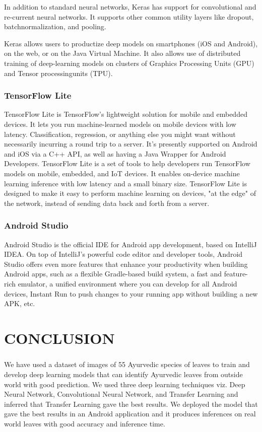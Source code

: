 In addition to standard neural networks, Keras has support for convolutional and re-current  neural  networks.   It  supports  other  common  utility  layers  like  dropout,  batchnormalization, and pooling.

Keras allows users to productize deep models on smartphones (iOS and Android), on the web, or on the Java Virtual Machine. It also allows use of distributed training of deep-learning models on clusters of Graphics Processing Units (GPU) and Tensor processingunits (TPU).

\subsection{TensorFlow Lite}
TensorFlow Lite is TensorFlow’s lightweight solution for mobile and embedded devices. It lets you run machine-learned models on mobile devices with low latency. Classification, regression, or anything else you might want without necessarily incurring a round trip to a server. It’s presently supported on Android and iOS via a C++ API, as well as having a Java Wrapper for Android Developers. TensorFlow Lite is a set of tools to help developers run TensorFlow models on mobile, embedded, and IoT devices. It enables on-device machine learning inference with low latency and a small binary size. TensorFlow Lite is designed to make it easy to perform machine learning on devices, "at the edge" of the network, instead of sending data back and forth from a server.

\subsection{Android Studio}
Android Studio is the official IDE for Android app development, based on IntelliJ IDEA. On top of IntelliJ’s powerful code editor and developer tools, Android Studio offers even more features that enhance your productivity when building Android apps, such as a flexible Gradle-based build system, a fast and feature-rich emulator, a unified environment where you can develop for all Android devices, Instant Run to push changes to your running app without building a new APK, etc.


\chapter{CONCLUSION}
\paragraph{}
We have used a dataset of images of 55 Ayurvedic species of leaves to train and develop deep learning models that can identify Ayurvedic leaves from outside world with good prediction. We used three deep learning techniques viz.  Deep Neural Network, Convolutional Neural Network, and Transfer Learning and inferred that Transfer Learning gave the best results. We deployed the model that gave the best results in an Android application and it produces inferences on real world leaves with good accuracy and inference time.

